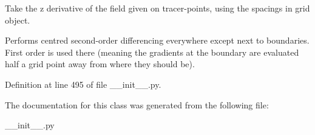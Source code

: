 Take the z derivative of the field given on tracer-\/points, using the spacings in grid object. 

Performs centred second-\/order differencing everywhere except next to boundaries. First order is used there (meaning the gradients at the boundary are evaluated half a grid point away from where they should be). 

Definition at line 495 of file \+\_\+\+\_\+init\+\_\+\+\_\+.\+py.



The documentation for this class was generated from the following file\+:\begin{DoxyCompactItemize}
\item 
\+\_\+\+\_\+init\+\_\+\+\_\+.\+py\end{DoxyCompactItemize}
